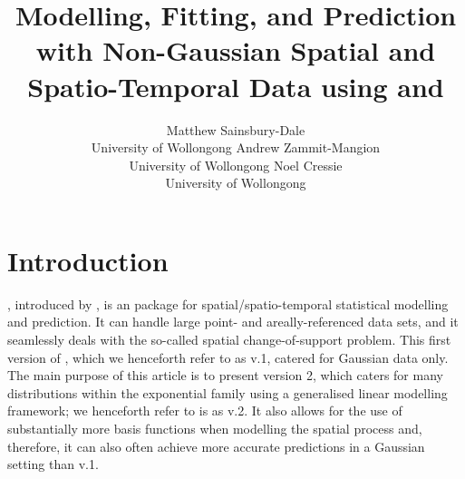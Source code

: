 \documentclass[nojss]{jss}
\author{Matthew Sainsbury-Dale\\University of Wollongong
   \And \quad\quad Andrew Zammit-Mangion\\\quad\quad University of Wollongong 
   \And Noel Cressie\\University of Wollongong}
\title{Modelling, Fitting, and Prediction with Non-Gaussian Spatial and Spatio-Temporal Data using \pkg{TMB} and \pkg{FRK}}
\newcommand{\red}[1]{\textcolor{red}{#1}}
\begin{document}
\sloppy %





\section{Introduction}\label{sec:intro}

, introduced by \cite{FRK_paper}, is an  \citep{Rcoreteam_2020} package for spatial/spatio-temporal statistical modelling and prediction. 
 It can handle large point- and areally-referenced data sets, and it seamlessly deals with the so-called spatial change-of-support problem. 
 This first version of , which we henceforth refer to as  v.1, catered for Gaussian data only. 
 The main purpose of this article is to present version 2, which caters for many distributions within the exponential family using a generalised linear modelling framework; we henceforth refer to is as  v.2. 
 It also allows for the use of substantially more basis functions when modelling the spatial process and, therefore, it can also often achieve more accurate predictions in a Gaussian setting than  v.1. 
\end{document}

